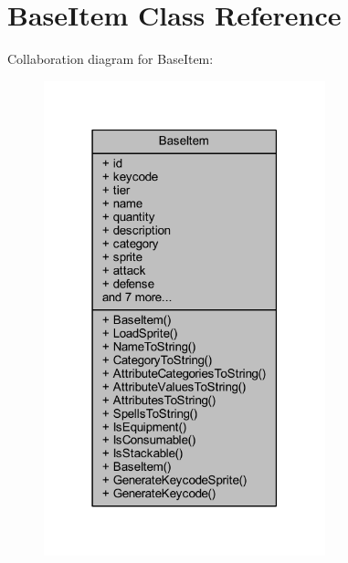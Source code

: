 \hypertarget{class_base_item}{}\section{Base\+Item Class Reference}
\label{class_base_item}


Collaboration diagram for Base\+Item\+:\nopagebreak
\begin{figure}[H]
\begin{center}
\leavevmode
\includegraphics[width=231pt]{class_base_item__coll__graph}
\end{center}
\end{figure}
